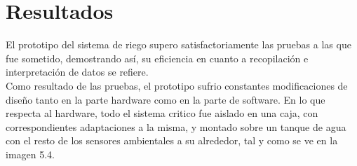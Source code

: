 \begin{comment} 
Se puede observar en la imagen \ref{evento1} que, cuando el sensor de humedad del suelo reporta valores altos, el riego se detiene en el momento. 

\begin{figure}[H]
	\begin{center}
		\subfigure[Detecci\'on de un nivel alto de humedad del suelo.]{\texttt{[image: r4]}}
		\subfigure[Riego detenido.]{\texttt{[image: r4]}}
	\end{center}
	\label{evento1}
	\caption{Primera evento considerado.}
\end{figure} 

En caso de que se detecten valores bajos de humedad en el suelo como en la imagen \ref{evento2}, el riego dar\'a inicio de manera autom\'atica. 

\begin{figure}[H]
	\begin{center}
		\subfigure[Detecci\'on de un nivel bajo de humedad del suelo.]{\texttt{[image: r4]}}
		\subfigure[Riego detenido.]{\texttt{[image: r4]}}
	\end{center}
	\label{evento2}
	\caption{Segundo evento considerado.}
\end{figure} 

Otra forma de detener el flujo de agua, es detectando un nivel de agua bajo parecido al de la imagen \ref{event3}.  

\begin{figure}[H]
	\begin{center}
		\subfigure[Detecci\'on de un bajo nivel de agua.]{\texttt{[image: r4]}}
		\subfigure[Riego detenido.]{\texttt{[image: r4]}}
	\end{center}
	\label{event3}
	\caption{Tercer evento considerado.}
\end{figure} 

\end{comment}

\section{Resultados}
El prototipo del sistema de riego supero satisfactoriamente las pruebas a las que fue sometido, demostrando as\'i, su eficiencia en cuanto a recopilaci\'on e interpretaci\'on de datos se refiere.\\ 
Como resultado de las pruebas, el prototipo sufrio constantes modificaciones de dise\~{n}o tanto en la parte hardware como en la parte de software. En lo que respecta al hardware, todo el sistema critico fue aislado en una caja, con correspondientes adaptaciones a la misma, y montado sobre un tanque de agua con el resto de los sensores ambientales a su alrededor, tal y como se ve en la imagen 5.4.%

